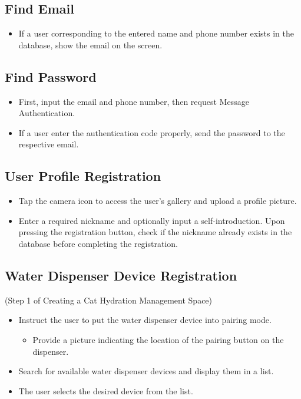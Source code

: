 \documentclass[conference]{IEEEtran}
\begin{document}
\subsection{Find Email}
\begin{itemize}
    \item If a user corresponding to the entered name and phone number exists in the database, show the email on the screen.\\
\end{itemize}

\subsection{Find Password}
\begin{itemize}
\item First, input the email and phone number, then request Message Authentication.
\item If a user enter the authentication code properly, send the password to the respective email.\\
\end{itemize} 

\subsection{User Profile Registration}
\begin{itemize}
    \item Tap the camera icon to access the user's gallery and upload a profile picture.
    \item Enter a required nickname and optionally input a self-introduction. Upon pressing the registration button, check if the nickname already exists in the database before completing the registration.\\
\end{itemize}

\subsection{Water Dispenser Device Registration}
(Step 1 of Creating a Cat Hydration Management Space)
\begin{itemize}
\item Instruct the user to put the water dispenser device into pairing mode.
    \begin{itemize}
        \item Provide a picture indicating the location of the pairing button on the dispenser.
    \end{itemize}
\item Search for available water dispenser devices and display them in a list.
\item The user selects the desired device from the list.\\
\end{itemize}
\end{document}
